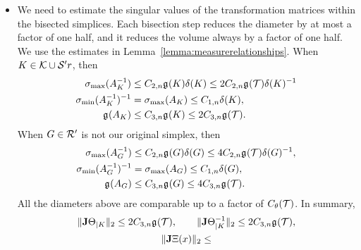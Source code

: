 \documentclass[10pt,a4paper]{article}
\begin{document}
\begin{itemize}
        
        \item 
        We need to estimate the singular values of the transformation matrices within the bisected simplices. 
        Each bisection step reduces the diameter by at most a factor of one half,
        and it reduces the volume always by a factor of one half. 
        We use the estimates in Lemma~\ref{lemma:measurerelationships}.
        When $K \in {\mathcal K} \cup {\mathcal S}'r$, then 
        \begin{align*}
             \sigma_{\max}( A_{K}^{-1} )
             &\leq 
             C_{2,n} {\mathfrak g}_{}(K) {\delta}(K)
             \leq 
             2 C_{2,n} {\mathfrak g}_{}({\mathcal T}) {\delta}(K)^{-1}
             \\
             \sigma_{\min}( A_{K}^{-1} )^{-1}
             &= 
             \sigma_{\max}( A_{K} ) 
             \leq 
             C_{1,n} {\delta}(K),
             \\ 
             {\mathfrak g}_{}( A_{K} )
             &\leq 
             C_{3,n} {\mathfrak g}_{}(K) \leq 2 C_{3,n} {\mathfrak g}_{}({\mathcal T})
             .
        \end{align*}
        When ${G} \in {\mathcal R}'$ is not our original simplex, then 
        \begin{align*}
             \sigma_{\max}( A_{{G}}^{-1} )
             &\leq 
             C_{2,n} {\mathfrak g}_{}({G}) {\delta}({G})
             \leq 
             4 C_{2,n} {\mathfrak g}_{}({\mathcal T}) {\delta}(G)^{-1},
             \\
             \sigma_{\min}( A_{{G}}^{-1} )^{-1}
             &= 
             \sigma_{\max}( A_{{G}} ) 
             \leq 
             C_{1,n} {\delta}({G}),
             \\ 
             {\mathfrak g}_{}( A_{{G}} )
             &\leq 
             C_{3,n} {\mathfrak g}_{}({G}) \leq 4 C_{3,n} {\mathfrak g}_{}({\mathcal T})
             .
        \end{align*}
        All the diameters above are comparable up to a factor of $C_\theta({\mathcal T})$.
        In summary,
        \begin{gather*}
            \matnorm{ \Jacobian \Theta_{|K}      } \leq 2 \Cdrei{n} \geometricshapemeasure(\calT)
            ,
            \qquad 
            \matnorm{ \Jacobian \Theta_{|K}^{-1} } \leq 2 \Cdrei{n} \geometricshapemeasure(\calT)
            ,
            \\
            \matnorm{ \Jacobian \Xi(x) }
            \leq 

\end{gather*}
\end{itemize}
\end{document}
